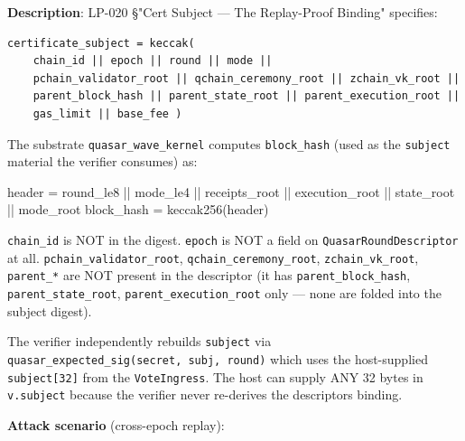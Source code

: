 \documentclass[
]{article}
\newenvironment{Shaded}{}{}
\newcommand{\NormalTok}[1]{#1}
\newcommand{\OperatorTok}[1]{\textcolor[rgb]{0.40,0.40,0.40}{#1}}
\newcounter{none} %
\begin{document}
\textbf{Description}: LP-020 §"Cert Subject --- The Replay-Proof
Binding" specifies:

\begin{verbatim}
certificate_subject = keccak(
    chain_id || epoch || round || mode ||
    pchain_validator_root || qchain_ceremony_root || zchain_vk_root ||
    parent_block_hash || parent_state_root || parent_execution_root ||
    gas_limit || base_fee )
\end{verbatim}

The substrate \texttt{quasar\_wave\_kernel} computes
\texttt{block\_hash} (used as the \texttt{subject} material the verifier
consumes) as:

\begin{Shaded}
\begin{Highlighting}[]
\NormalTok{header }\OperatorTok{=}\NormalTok{ round\_le8 }\OperatorTok{||}\NormalTok{ mode\_le4 }\OperatorTok{||}\NormalTok{ receipts\_root }\OperatorTok{||}\NormalTok{ execution\_root }\OperatorTok{||}\NormalTok{ state\_root }\OperatorTok{||}\NormalTok{ mode\_root}
\NormalTok{block\_hash }\OperatorTok{=}\NormalTok{ keccak256}\OperatorTok{(}\NormalTok{header}\OperatorTok{)}
\end{Highlighting}
\end{Shaded}

\texttt{chain\_id} is NOT in the digest. \texttt{epoch} is NOT a field
on \texttt{QuasarRoundDescriptor} at all.
\texttt{pchain\_validator\_root}, \texttt{qchain\_ceremony\_root},
\texttt{zchain\_vk\_root}, \texttt{parent\_*} are NOT present in the
descriptor (it has \texttt{parent\_block\_hash},
\texttt{parent\_state\_root}, \texttt{parent\_execution\_root} only ---
none are folded into the subject digest).

The verifier independently rebuilds \texttt{subject} via
\texttt{quasar\_expected\_sig(secret,\ subj,\ round)} which uses the
host-supplied \texttt{subject{[}32{]}} from the \texttt{VoteIngress}.
The host can supply ANY 32 bytes in \texttt{v.subject} because the
verifier never re-derives the descriptor\textquotesingle s binding.

\textbf{Attack scenario} (cross-epoch replay):
\end{document}
